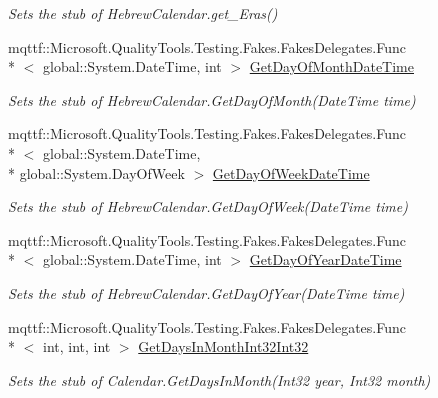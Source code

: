 \begin{DoxyCompactItemize}
\begin{DoxyCompactList}\small\item\em Sets the stub of Hebrew\-Calendar.\-get\-\_\-\-Eras()\end{DoxyCompactList}\item 
mqttf\-::\-Microsoft.\-Quality\-Tools.\-Testing.\-Fakes.\-Fakes\-Delegates.\-Func\\*
$<$ global\-::\-System.\-Date\-Time, int $>$ \hyperlink{class_system_1_1_globalization_1_1_fakes_1_1_stub_hebrew_calendar_a51bbdd58fd126d38eb348c67b59f3d93}{Get\-Day\-Of\-Month\-Date\-Time}
\begin{DoxyCompactList}\small\item\em Sets the stub of Hebrew\-Calendar.\-Get\-Day\-Of\-Month(\-Date\-Time time)\end{DoxyCompactList}\item 
mqttf\-::\-Microsoft.\-Quality\-Tools.\-Testing.\-Fakes.\-Fakes\-Delegates.\-Func\\*
$<$ global\-::\-System.\-Date\-Time, \\*
global\-::\-System.\-Day\-Of\-Week $>$ \hyperlink{class_system_1_1_globalization_1_1_fakes_1_1_stub_hebrew_calendar_a91e9eefc5912a0199f404c15514649fb}{Get\-Day\-Of\-Week\-Date\-Time}
\begin{DoxyCompactList}\small\item\em Sets the stub of Hebrew\-Calendar.\-Get\-Day\-Of\-Week(\-Date\-Time time)\end{DoxyCompactList}\item 
mqttf\-::\-Microsoft.\-Quality\-Tools.\-Testing.\-Fakes.\-Fakes\-Delegates.\-Func\\*
$<$ global\-::\-System.\-Date\-Time, int $>$ \hyperlink{class_system_1_1_globalization_1_1_fakes_1_1_stub_hebrew_calendar_a89dbe94bcf22d8e0b6ead10ad9f79547}{Get\-Day\-Of\-Year\-Date\-Time}
\begin{DoxyCompactList}\small\item\em Sets the stub of Hebrew\-Calendar.\-Get\-Day\-Of\-Year(\-Date\-Time time)\end{DoxyCompactList}\item 
mqttf\-::\-Microsoft.\-Quality\-Tools.\-Testing.\-Fakes.\-Fakes\-Delegates.\-Func\\*
$<$ int, int, int $>$ \hyperlink{class_system_1_1_globalization_1_1_fakes_1_1_stub_hebrew_calendar_ab166aa6607da02bb9a5a1a56c2847bab}{Get\-Days\-In\-Month\-Int32\-Int32}
\begin{DoxyCompactList}\small\item\em Sets the stub of Calendar.\-Get\-Days\-In\-Month(\-Int32 year, Int32 month)\end{DoxyCompactList}\item 

\end{DoxyCompactItemize}
